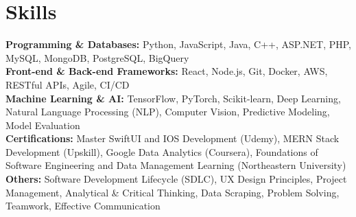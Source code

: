 \documentclass[a4paper,10pt]{article}
\begin{document}
\section*{Skills}
\textbf{Programming \& Databases: } Python, JavaScript, Java, C++, ASP.NET, PHP, MySQL, MongoDB, PostgreSQL, BigQuery \\
\textbf{Front-end \& Back-end Frameworks: } React, Node.js, Git, Docker, AWS, RESTful APIs, Agile, CI/CD \\
\textbf{Machine Learning \& AI: } TensorFlow, PyTorch, Scikit-learn, Deep Learning, Natural Language Processing (NLP), Computer Vision, Predictive Modeling, Model Evaluation \\
\textbf{Certifications:} Master SwiftUI and IOS Development (Udemy), MERN Stack Development (Upskill), Google Data Analytics (Coursera), Foundations of Software Engineering and Data Management Learning (Northeastern University) \\
\textbf{Others: } Software Development Lifecycle (SDLC), UX Design Principles, Project Management, Analytical \& Critical Thinking, Data Scraping, Problem Solving, Teamwork, Effective Communication \\

\vspace{-4mm}
\end{document}
